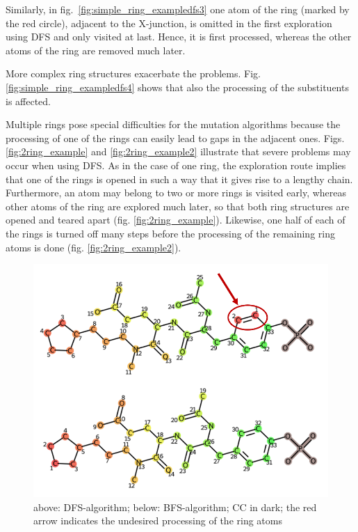 Similarly, in fig.~\ref{fig:simple_ring_exampledfs3} one atom of the ring (marked by the red circle), adjacent to the X-junction, is omitted in the first exploration using DFS and only visited at last. Hence, it is first processed, whereas the other atoms of the ring are removed much later.

More complex ring structures exacerbate the problems. Fig. \ref{fig:simple_ring_exampledfs4} shows that also the processing of the substituents is affected.

Multiple rings pose special difficulties for the mutation algorithms because
the processing of one of the rings can easily lead to gaps in the adjacent
ones. Figs. \ref{fig:2ring_example} and  \ref{fig:2ring_example2} illustrate that severe problems may occur when using DFS.
As in the case of one ring, the exploration route implies that one
of the rings is opened in such a way that it gives rise to a lengthy chain.
Furthermore, an atom may belong to two or more rings is visited early, whereas other atoms of the ring are explored much later, so that both ring structures are opened
and teared apart (fig. \ref{fig:2ring_example}). Likewise, one half of each of the
rings is turned off many steps before the processing of the remaining ring atoms is done (fig. \ref{fig:2ring_example2}). 

\begin{figure}
\includegraphics[scale=0.75]{simple_ring_exampledfs2_two_rows}\caption{above: DFS-algorithm; below: BFS-algorithm; CC in dark; the
red arrow indicates the undesired processing of the ring atoms}
\label{fig:simple_ring_exampledfs2}
\end{figure}

